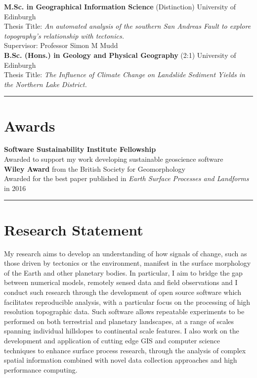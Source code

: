 \documentclass[10pt, a4paper]{article}
\newcommand{\years}[1]{\marginnote{\scriptsize #1}}
\begin{document}
\years{2011--2012}\textbf{M.Sc. in Geographical Information Science} (Distinction) University of Edinburgh\\[0.05cm]
Thesis Title: \textit{An automated analysis of the southern San Andreas Fault to explore topography’s relationship with tectonics.}\\[0.05cm]
Supervisor: Professor Simon M Mudd\\

\years{2007--2011}\textbf{B.Sc. (Hons.) in Geology and Physical Geography} (2:1) University of Edinburgh\\[0.05cm]
Thesis Title: \textit{The Influence of Climate Change on Landslide Sediment Yields in the Northern Lake District.}\\[0.05cm]

\hrule
\section*{Awards}
\noindent

\years{2018}\textbf{Software Sustainability Institute Fellowship}\\[0.05cm]
Awarded to support my work developing sustainable geoscience software\\[0.05cm]

\years{2017}\textbf{Wiley Award} from the British Society for Geomorphology\\[0.05cm]
Awarded for the best paper published in \textit{Earth Surface Processes and Landforms} in 2016\\[0.05cm]

\iflong

  \hrule
  \section*{Research Statement}
  \noindent

  My research aims to develop an understanding of how signals of change, such as those driven by tectonics or the environment, manifest in the surface morphology of the Earth and other planetary bodies. In particular, I aim to bridge the gap between numerical models, remotely sensed data and field observations and I conduct such research through the development of open source software which facilitates reproducible analysis, with a particular focus on the processing of high resolution topographic data. Such software allows repeatable experiments to be performed on both terrestrial and planetary landscapes, at a range of scales spanning individual hillslopes to continental scale features. I also work on the development and application of cutting edge GIS and computer science techniques to enhance surface process research, through the analysis of complex spatial information combined with novel data collection approaches and high performance computing.\\[0.05cm]
\end{document}
